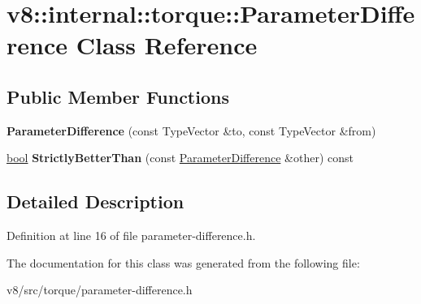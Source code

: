 \hypertarget{classv8_1_1internal_1_1torque_1_1ParameterDifference}{}\section{v8\+:\+:internal\+:\+:torque\+:\+:Parameter\+Difference Class Reference}
\label{classv8_1_1internal_1_1torque_1_1ParameterDifference}
\subsection*{Public Member Functions}
\begin{DoxyCompactItemize}
\item 
\mbox{\label{classv8_1_1internal_1_1torque_1_1ParameterDifference_a6bcdde471a30a6a6a8a19be7ab093ac5}} 
{\bfseries Parameter\+Difference} (const Type\+Vector \&to, const Type\+Vector \&from)
\item 
\mbox{\label{classv8_1_1internal_1_1torque_1_1ParameterDifference_ac16e460e2e6f6dc99ec3c46124ce9d31}} 
\mbox{\hyperlink{classbool}{bool}} {\bfseries Strictly\+Better\+Than} (const \mbox{\hyperlink{classv8_1_1internal_1_1torque_1_1ParameterDifference}{Parameter\+Difference}} \&other) const
\end{DoxyCompactItemize}


\subsection{Detailed Description}


Definition at line 16 of file parameter-\/difference.\+h.



The documentation for this class was generated from the following file\+:\begin{DoxyCompactItemize}
\item 
v8/src/torque/parameter-\/difference.\+h\end{DoxyCompactItemize}
